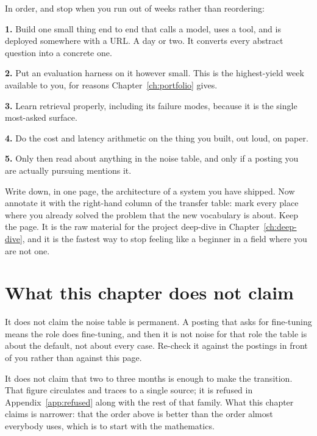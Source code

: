 \begin{kitmethod}
In order, and stop when you run out of weeks rather than reordering:

\textbf{1.} Build one small thing end to end that calls a model, uses a tool,
and is deployed somewhere with a URL. A day or two. It converts every abstract
question into a concrete one.

\textbf{2.} Put an evaluation harness on it \dash{} however small. This is the
highest-yield week available to you, for reasons Chapter~\ref{ch:portfolio}
gives.

\textbf{3.} Learn retrieval properly, including its failure modes, because it
is the single most-asked surface.

\textbf{4.} Do the cost and latency arithmetic on the thing you built, out
loud, on paper.

\textbf{5.} Only then read about anything in the noise table, and only if a
posting you are actually pursuing mentions it.
\end{kitmethod}

\begin{drill}
Write down, in one page, the architecture of a system you have shipped. Now
annotate it with the right-hand column of the transfer table: mark every place
where you already solved the problem that the new vocabulary is about. Keep the
page. It is the raw material for the project deep-dive in
Chapter~\ref{ch:deep-dive}, and it is the fastest way to stop feeling like a
beginner in a field where you are not one.
\end{drill}

\section*{What this chapter does not claim}

It does not claim the noise table is permanent. A posting that asks for
fine-tuning means the role does fine-tuning, and then it is not noise for that
role \dash{} the table is about the default, not about every case. Re-check it
against the postings in front of you rather than against this page.

It does not claim that two to three months is enough to make the transition.
That figure circulates and traces to a single source; it is refused in
Appendix~\ref{app:refused} along with the rest of that family. What this chapter
claims is narrower: that the order above is better than the order almost
everybody uses, which is to start with the mathematics.
